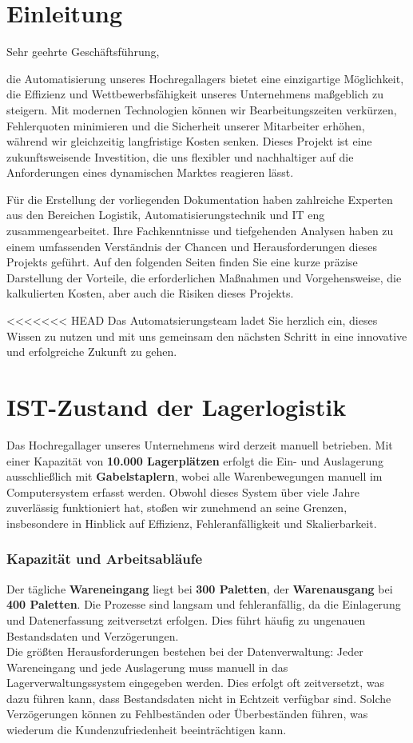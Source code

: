 \chapter{Einleitung}

Sehr geehrte Geschäftsführung,  

die Automatisierung unseres Hochregallagers bietet eine einzigartige Möglichkeit, die Effizienz und Wettbewerbsfähigkeit unseres Unternehmens maßgeblich zu steigern. Mit modernen Technologien können wir Bearbeitungszeiten verkürzen, Fehlerquoten minimieren und die Sicherheit unserer Mitarbeiter erhöhen, während wir gleichzeitig langfristige Kosten senken. Dieses Projekt ist eine zukunftsweisende Investition, die uns flexibler und nachhaltiger auf die Anforderungen eines dynamischen Marktes reagieren lässt.  

Für die Erstellung der vorliegenden Dokumentation haben zahlreiche Experten aus den Bereichen Logistik, Automatisierungstechnik und IT eng zusammengearbeitet. Ihre Fachkenntnisse und tiefgehenden Analysen haben zu einem umfassenden Verständnis der Chancen und Herausforderungen dieses Projekts geführt. Auf den folgenden Seiten finden Sie eine kurze präzise Darstellung der Vorteile, die erforderlichen Maßnahmen und Vorgehensweise, die kalkulierten Kosten, aber auch die Risiken dieses Projekts.  

<<<<<<< HEAD
Das Automatsierungsteam ladet Sie herzlich ein, dieses Wissen zu nutzen und mit uns gemeinsam den nächsten Schritt in eine innovative und erfolgreiche Zukunft zu gehen. 


\chapter{IST-Zustand der Lagerlogistik} 

Das Hochregallager unseres Unternehmens wird derzeit manuell betrieben. Mit einer Kapazität von \textbf{10.000 Lagerplätzen} erfolgt die Ein- und Auslagerung ausschließlich mit \textbf{Gabelstaplern}, wobei alle Warenbewegungen manuell im Computersystem erfasst werden. Obwohl dieses System über viele Jahre zuverlässig funktioniert hat, stoßen wir zunehmend an seine Grenzen, insbesondere in Hinblick auf Effizienz, Fehleranfälligkeit und Skalierbarkeit.

\subsection*{Kapazität und Arbeitsabläufe}
Der tägliche \textbf{Wareneingang} liegt bei \textbf{300 Paletten}, der \textbf{Warenausgang} bei \textbf{400 Paletten}. Die Prozesse sind langsam und fehleranfällig, da die Einlagerung und Datenerfassung zeitversetzt erfolgen. Dies führt häufig zu ungenauen Bestandsdaten und Verzögerungen.\\ 
Die größten Herausforderungen bestehen bei der Datenverwaltung: Jeder Wareneingang und jede Auslagerung muss manuell in das Lagerverwaltungssystem eingegeben werden. Dies erfolgt oft zeitversetzt, was dazu führen kann, dass Bestandsdaten nicht in Echtzeit verfügbar sind. Solche Verzögerungen können zu Fehlbeständen oder Überbeständen führen, was wiederum die Kundenzufriedenheit beeinträchtigen kann.

